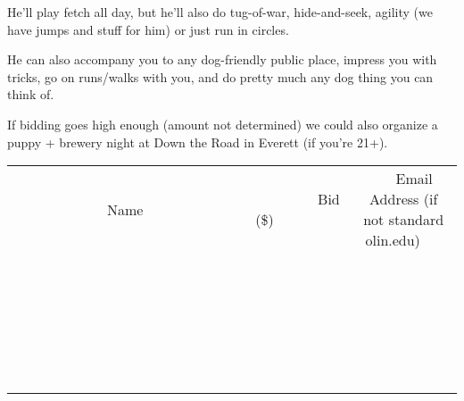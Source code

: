\documentclass[11pt]{article}
\begin{document}
He'll play fetch all day, but he'll also do tug-of-war, hide-and-seek, agility (we have jumps and stuff for him) or just run in circles. 



He can also accompany you to any dog-friendly public place, impress you with tricks, go on runs/walks with you, and do pretty much any dog thing you can think of. 



If bidding goes high enough (amount not determined) we could also organize a puppy + brewery night at Down the Road in Everett (if you're 21+). \\
					[6ex]
					\begin{tabular}{c c c}
						~~~~~~~~~~~~~Name~~~~~~~~~~~~~ & ~~~~~~~~~Bid (\$)~~~~~~~~~ & ~~~Email Address (if not standard olin.edu)~~~ \\
				
 & & \\
\hline
 & & \\
\hline
 & & \\
\hline
 & & \\
\hline
 & & \\
\hline
 & & \\
\hline
 & & \\
\hline
 & & \\
\hline
 & & \\
\hline
 & & \\
\hline
 & & \\
\hline
 & & \\
\hline
 & & \\
\hline
 & & \\
\hline
 & & \\
\hline
 & & \\
\hline
 & & \\
\hline
 & & \\
\hline
 & & \\
\hline
 & & \\
\hline
 & & \\
\hline
 & & \\
\hline
 & & \\
\hline
 & & \\
\hline
 & & \\
\hline
 & & \\
\hline
					\end{tabular}
					\clearpage
				
\end{document}
